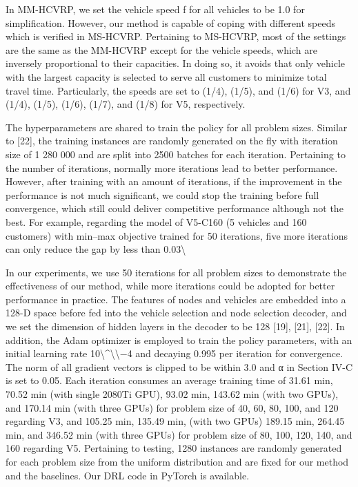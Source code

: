 \documentclass{article}
\begin{document}
	In MM-HCVRP, we set the vehicle speed f for all vehicles to be 1.0 for simplification. However, our method is capable of coping with different speeds which is verified in MS-HCVRP. Pertaining to MS-HCVRP, most of the settings are the same as the MM-HCVRP except for the vehicle speeds, which are inversely proportional to their capacities. In doing so, it avoids that only vehicle with the largest capacity is selected to serve all customers to minimize total travel time. Particularly, the speeds are set to (1/4), (1/5), and (1/6) for V3, and (1/4), (1/5), (1/6), (1/7), and (1/8) for V5, respectively.
	
	The hyperparameters are shared to train the policy for all problem sizes. Similar to [22], the training instances are randomly generated on the fly with iteration size of 1 280 000 and are split into 2500 batches for each iteration. Pertaining to the number of iterations, normally more iterations lead to better performance. However, after training with an amount of iterations, if the improvement in the performance is not much significant, we could stop the training before full convergence, which still could deliver competitive performance although not the best. For example, regarding the model of V5-C160 (5 vehicles and 160 customers) with min–max objective trained for 50 iterations, five more iterations can only reduce the gap by less than 0.03\textbackslash{}%
	
	In our experiments, we use 50 iterations for all problem sizes to demonstrate the effectiveness of our method, while more iterations could be adopted for better performance in practice. The features of nodes and vehicles are embedded into a 128-D space before fed into the vehicle selection and node selection decoder, and we set the dimension of hidden layers in the decoder to be 128 [19], [21], [22]. In addition, the Adam optimizer is employed to train the policy parameters, with an initial learning rate 10\textbackslash{}^\textbackslash{}{\textbackslash{}}−4 and decaying 0.995 per iteration for convergence. The norm of all gradient vectors is clipped to be within 3.0 and α in Section IV-C is set to 0.05. Each iteration consumes an average training time of 31.61 min, 70.52 min (with single 2080Ti GPU), 93.02 min, 143.62 min (with two GPUs), and 170.14 min (with three GPUs) for problem size of 40, 60, 80, 100, and 120 regarding V3, and 105.25 min, 135.49 min, (with two GPUs) 189.15 min, 264.45 min, and 346.52 min (with three GPUs) for problem size of 80, 100, 120, 140, and 160 regarding V5. Pertaining to testing, 1280 instances are randomly generated for each problem size from the uniform distribution and are fixed for our method and the baselines. Our DRL code in PyTorch is available.
	
\end{document}
